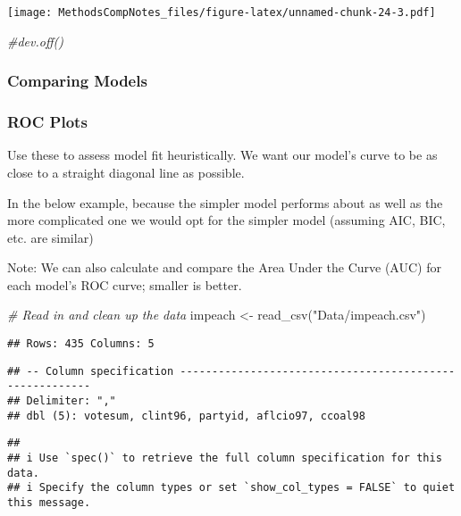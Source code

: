 \documentclass[
]{article}
\newenvironment{Shaded}{\begin{snugshade}}{\end{snugshade}}
\newcommand{\CommentTok}[1]{\textcolor[rgb]{0.56,0.35,0.01}{\textit{#1}}}
\newcommand{\FunctionTok}[1]{\textcolor[rgb]{0.00,0.00,0.00}{#1}}
\newcommand{\NormalTok}[1]{#1}
\newcommand{\OtherTok}[1]{\textcolor[rgb]{0.56,0.35,0.01}{#1}}
\newcommand{\StringTok}[1]{\textcolor[rgb]{0.31,0.60,0.02}{#1}}
\begin{document}
\texttt{[image: MethodsCompNotes\_files/figure-latex/unnamed-chunk-24-3.pdf]}

\begin{Shaded}
\begin{Highlighting}[]
\CommentTok{\#dev.off()}
\end{Highlighting}
\end{Shaded}

\hypertarget{comparing-models}{%
\subsubsection{Comparing Models}\label{comparing-models}}

\hypertarget{roc-plots}{%
\subsubsection{ROC Plots}\label{roc-plots}}

Use these to assess model fit heuristically. We want our model's curve
to be as close to a straight diagonal line as possible.

In the below example, because the simpler model performs about as well
as the more complicated one we would opt for the simpler model (assuming
AIC, BIC, etc. are similar)

Note: We can also calculate and compare the Area Under the Curve (AUC)
for each model's ROC curve; smaller is better.

\begin{Shaded}
\begin{Highlighting}[]
\CommentTok{\# Read in and clean up the data}
\NormalTok{impeach }\OtherTok{\textless{}{-}} \FunctionTok{read\_csv}\NormalTok{(}\StringTok{"Data/impeach.csv"}\NormalTok{)}
\end{Highlighting}
\end{Shaded}

\begin{verbatim}
## Rows: 435 Columns: 5
\end{verbatim}

\begin{verbatim}
## -- Column specification --------------------------------------------------------
## Delimiter: ","
## dbl (5): votesum, clint96, partyid, aflcio97, ccoal98
\end{verbatim}

\begin{verbatim}
## 
## i Use `spec()` to retrieve the full column specification for this data.
## i Specify the column types or set `show_col_types = FALSE` to quiet this message.
\end{verbatim}
\end{document}
